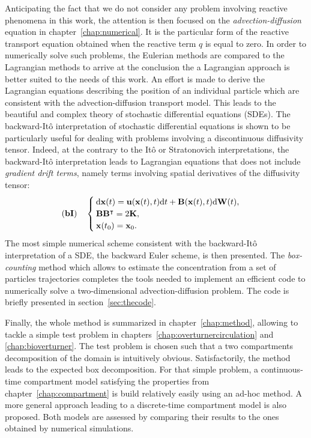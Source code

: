 Anticipating the fact that we do not consider any problem involving reactive phenomena in this work, the attention is then focused on the \textit{advection-diffusion} equation in chapter~\ref{chap:numerical}. It is the particular form of the reactive transport equation obtained when the reactive term $q$ is equal to zero. In order to numerically solve such problems, the Eulerian methods are compared to the Lagrangian methods to arrive at the conclusion the a Lagrangian approach is better suited to the needs of this work. An effort is made to derive the Lagrangian equations describing the position of an individual particle which are consistent with the advection-diffusion transport model. This leads to the beautiful and complex theory of stochastic differential equations (SDEs). The backward-Itô interpretation of stochastic differential equations is shown to be particularly useful for dealing with problems involving a discontinuous diffusivity tensor. Indeed, at the contrary to the Itô or Stratonovich interpretations, the backward-Itô interpretation leads to Lagrangian equations that does not include \textit{gradient drift terms}, namely terms involving spatial derivatives of the diffusivity tensor:
\[  
	\mathbf{(bI)} \quad
	\begin{cases}
		\mathrm d \mathbf{x}(t) =  \mathbf u(\mathbf x(t),t) \mathrm dt + \mathbf B(\mathbf x(t),t) \mathrm d \mathbf W(t),\\
		\mathbf B \mathbf B^\intercal = 2 \mathbf K,\\
		\mathbf x(t_0) = \mathbf x_0.
	\end{cases}{}
\]
The most simple numerical scheme consistent with the backward-Itô interpretation of a SDE, the backward Euler scheme, is then presented. The \textit{box-counting} method which allows to estimate the concentration from a set of particles trajectories completes the tools needed to implement an efficient code to numerically solve a two-dimensional advection-diffusion problem. The code is briefly presented in section~\ref{sec:thecode}. 

Finally, the whole method is summarized in chapter~\ref{chap:method}, allowing to tackle a simple test problem in chapters~\ref{chap:overturnercirculation} and \ref{chap:bioverturner}. The test problem is chosen such that a two compartments decomposition of the domain is intuitively obvious. Satisfactorily, the method leads to the expected box decomposition. For that simple problem, a continuous-time compartment model satisfying the properties from chapter~\ref{chap:compartment} is build relatively easily using an ad-hoc method. A more general approach leading to a discrete-time compartment model is also proposed. Both models are assessed by comparing their results to the ones obtained by numerical simulations.

